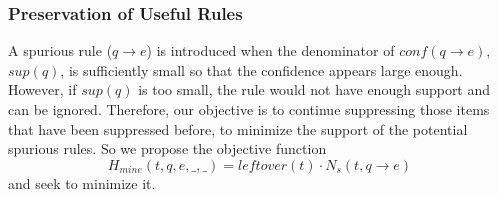 %

\subsubsection{Preservation of Useful Rules}

A spurious rule ($q \rightarrow e$) is introduced when
the denominator of $conf(q \rightarrow e)$, $sup(q)$,
is sufficiently small so that the confidence appears large enough.
However, if $sup(q)$ is too small, the rule would not have enough
support and can be ignored.
Therefore, our objective is to continue suppressing
those items that have been suppressed before,
to minimize the support of the potential spurious rules.
So we propose the objective function
\begin{equation}\label{eq:hmine}
H_{mine}(t, q, e, \_, \_)=leftover(t)\cdot N_s(t, q\rightarrow e)
\end{equation}
and seek to minimize it.

